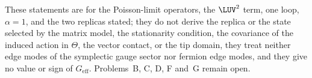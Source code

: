 These statements are for the Poisson-limit operators, the \(\LUV^2\) term, one loop, \(\alpha=1\), and the two replicas stated; they do not derive the replica or the state selected by the matrix model, the stationarity condition, the covariance of the induced action in \(\Theta\), the vector contact, or the tip domain, they treat neither edge modes of the symplectic gauge sector nor fermion edge modes, and they give no value or sign of \(G_{\mathrm{eff}}\). Problems~B, C, D, F and~G remain open.
